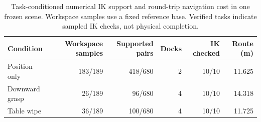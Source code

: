\begin{table}[t]
\centering
\caption{Task-conditioned numerical IK support and round-trip navigation cost in one frozen scene. Workspace samples use a fixed reference base. Verified tasks indicate sampled IK checks, not physical completion.}
\label{tab:task-constraint-comparison}
\begin{tabular}{lrrrrr}
\toprule
Condition & Workspace samples & Supported pairs & Docks & IK checked & Route (m) \\
\midrule
Position only & 183/189 & 418/680 & 2 & 10/10 & 11.625 \\
Downward grasp & 26/189 & 96/680 & 4 & 10/10 & 14.318 \\
Table wipe & 36/189 & 100/680 & 4 & 10/10 & 11.725 \\
\bottomrule
\end{tabular}
\end{table}
